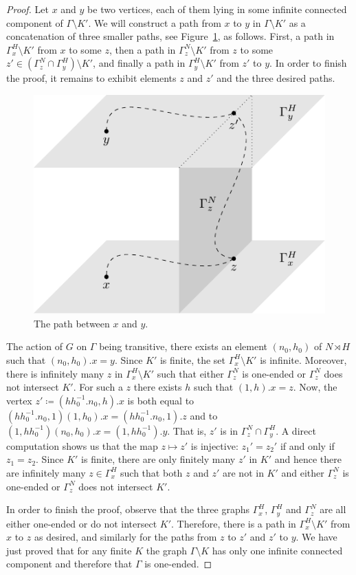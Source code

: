 \documentclass[a4paper]{article}
\theoremstyle{definition}
\theoremstyle{remark}
\begin{document}
\begin{proof}
Let $x$ and $y$ be two vertices, each of them lying in some infinite connected component of $\Gamma\setminus K'$.
We will construct a path from $x$ to $y$ in $\Gamma\setminus K'$ as a concatenation of three smaller paths, see Figure~\ref{Figure:PathSemiDirect}, as follows.
First, a path in $\Gamma_x^H\setminus K'$ from $x$ to some $z$, then a path in $\Gamma_z^N\setminus K'$ from $z$ to some $z'\in (\Gamma_z^N\cap \Gamma_y^H)\setminus K'$, and finally a path in $\Gamma_y^H\setminus K'$ from $z'$ to $y$.
In order to finish the proof, it remains to exhibit elements $z$ and $z'$ and the three desired paths.
%
%
\begin{figure}[htbp]\centering
\includegraphics{SemiDirect}
\caption{The path between $x$ and $y$.}
\label{Figure:PathSemiDirect}
\end{figure}

%
%

The action of $G$ on $\Gamma$ being transitive, there exists an element $(n_0,h_0)$ of $N \rtimes H$ such that $(n_0,h_0).x = y$.
Since $K'$ is finite, the set $\Gamma_x^H\setminus K'$ is infinite.
Moreover, there is infinitely many $z$ in $\Gamma_x^H\setminus K'$ such that either $\Gamma_z^N$ is one-ended or $\Gamma_z^N$ does not intersect $K'$.
For such a $z$ there exists $h$ such that $(1,h).x=z$.
Now, the vertex $z'\coloneqq(hh_0^{-1}.n_0,h).x$ is both equal to $(hh_0^{-1}.n_0,1)(1,h_0).x=(hh_0^{-1}.n_0,1).z$ and to $(1,hh_0^{-1})(n_0,h_0).x=(1,hh_0^{-1}).y$. That is, $z'$ is in $\Gamma_z^N\cap \Gamma_y^H$.
A direct computation shows us that the map $z\mapsto z'$ is injective: $z_1'=z_2'$ if and only if $z_1=z_2$.
Since $K'$ is finite, there are only finitely many $z'$ in $K'$ and hence there are infinitely many $z\in \Gamma_x^H$ such that both $z$ and $z'$ are not in $K'$ and either $\Gamma_z^N$ is one-ended or $\Gamma_z^N$ does not intersect $K'$.

In order to finish the proof, observe that the three graphs $\Gamma_x^H$, $\Gamma_y^H$ and $\Gamma_z^N$ are all either one-ended or do not intersect $K'$.
Therefore, there is a path in $\Gamma_x^H\setminus K'$ from $x$ to $z$ as desired, and similarly for the paths from $z$ to $z'$ and $z'$ to $y$.
We have just proved that for any finite $K$ the graph $\Gamma\setminus K$ has only one infinite connected component and therefore that $\Gamma$ is one-ended.
\end{proof}
\end{document}
